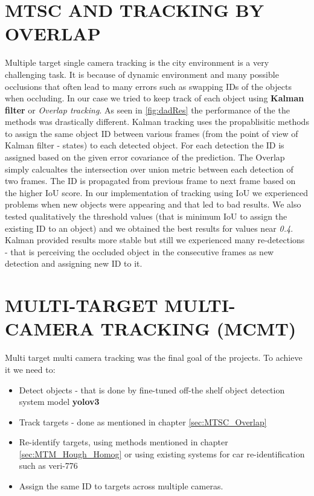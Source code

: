 \documentclass[journal, a4paper]{IEEEtran}
\begin{document}
\section{MTSC AND TRACKING BY OVERLAP}
\label{sec:MTSC_Overlap}
Multiple target single camera tracking is the city environment is a very challenging task. It is because of dynamic environment and many possible occlusions that often lead to many errors such as swapping IDs of the objects when occluding. In our case we tried to keep track of each object using \textbf{Kalman filter} or \textit{Overlap tracking}. As seen in \autoref{fig:dadRes} the performance of the the methods was drastically different. Kalman tracking uses the propablisitic methods to assign the same object ID between various frames (from the point of view of Kalman filter - states) to each detected object. For each detection the ID is assigned based on the given error covariance of the prediction. The Overlap simply calcualtes the intersection over union metric between each detection of two frames. The ID is propagated from previous frame to next frame based on the higher IoU score. In our implementation of tracking using IoU we experienced problems when new objects were appearing and that led to bad results. We also tested qualitatively the threshold values (that is minimum IoU to assign the existing ID to an object) and we obtained the best results for values near \textit{0.4}.  Kalman provided results more stable but still we experienced many re-detections - that is perceiving the occluded object in the consecutive frames as new detection and assigning new ID to it.

\section{MULTI-TARGET MULTI-CAMERA TRACKING (MCMT)}
\label{sec:MTMC}
Multi target multi camera tracking was the final goal of the projects. To achieve it we need to:
\begin{itemize}
    \item Detect objects - that is done by fine-tuned off-the shelf object detection system model \textbf{yolov3}
    \item Track targets - done as mentioned in chapter \autoref{sec:MTSC_Overlap}
    \item Re-identify targets, using methods mentioned in chapter \autoref{sec:MTM_Hough_Homog} or using existing systems for car re-identification such as veri-776
    \item Assign the same ID to targets across multiple cameras.
\end{itemize}
\end{document}

